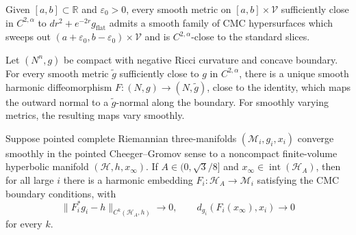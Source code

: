 \begin{proposition}
\label{prop:chow-iv-cmc-sweepout-almost-cusp}


Given \([a,b]\subset\mathbb R\) and \(\varepsilon_0>0\), every smooth metric
on \([a,b]\times\mathcal V\) sufficiently close in \(C^{2,\alpha}\) to
\(dr^2+e^{-2r}g_{\mathrm{flat}}\) admits a smooth family of CMC hypersurfaces
which sweeps out \((a+\varepsilon_0,b-\varepsilon_0)\times\mathcal V\) and is
\(C^{2,\alpha}\)-close to the standard slices.
\end{proposition}

\begin{proposition}
\label{prop:chow-iv-harmonic-maps-near-identity}

Let \((N^n,g)\) be compact with negative Ricci curvature and concave boundary.
For every smooth metric \(\widetilde g\) sufficiently close to \(g\) in
\(C^{2,\alpha}\), there is a unique smooth harmonic diffeomorphism
\(F:(N,g)\to(N,\widetilde g)\), close to the identity, which maps the outward
normal to a \(\widetilde g\)-normal along the boundary.  For smoothly varying
metrics, the resulting maps vary smoothly.
\end{proposition}

\begin{proposition}
\label{prop:chow-iv-harmonic-parametrizations}


Suppose pointed complete Riemannian three-manifolds
\((\mathcal M_i,g_i,x_i)\) converge smoothly in the pointed Cheeger--Gromov
sense to a noncompact finite-volume hyperbolic manifold
\((\mathcal H,h,x_\infty)\).  If \(A\in(0,\sqrt3/8]\) and
\(x_\infty\in\operatorname{int}(\mathcal H_A)\), then for all large \(i\)
there is a harmonic embedding \(F_i:\mathcal H_A\to\mathcal M_i\) satisfying
the CMC boundary conditions, with
\[
 \|F_i^*g_i-h\|_{C^k(\mathcal H_A,h)}\longrightarrow0,
 \qquad d_{g_i}(F_i(x_\infty),x_i)\longrightarrow0
\]
for every \(k\).
\end{proposition}

